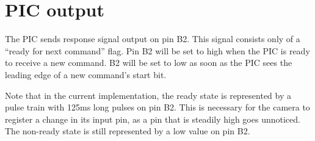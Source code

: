 \documentclass[12pt]{article}
\begin{document}
\section{ PIC output }
The PIC sends response signal output on pin B2.  This signal consists only of a ``ready for next command'' flag.  Pin B2 will be set to high when the PIC is ready to receive a new command.  B2 will be set to low as soon as the PIC sees the leading edge of a new command's start bit.  

Note that in the current implementation, the ready state is represented by a pulse train with 125ms long pulses on pin B2.  This is necessary for the camera to register a change in its input pin, as a pin that is steadily high goes unnoticed.  The non-ready state is still represented by a low value on pin B2.
\end{document}
